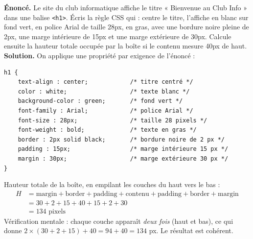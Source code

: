 \documentclass[11pt]{article}
\begin{document}
\begin{exoresolu}
\textbf{Énoncé.} Le site du club informatique affiche le titre « Bienvenue au Club Info » dans une balise \texttt{<h1>}. Écris la règle CSS qui : centre le titre, l'affiche en blanc sur fond vert, en police Arial de taille 28px, en gras, avec une bordure noire pleine de 2px, une marge intérieure de 15px et une marge extérieure de 30px. Calcule ensuite la hauteur totale occupée par la boîte si le contenu mesure 40px de haut.
\tcblower
\textbf{Solution.} On applique une propriété par exigence de l'énoncé :
\begin{lstlisting}
h1 {
    text-align : center;            /* titre centré */
    color : white;                  /* texte blanc */
    background-color : green;       /* fond vert */
    font-family : Arial;            /* police Arial */
    font-size : 28px;               /* taille 28 pixels */
    font-weight : bold;             /* texte en gras */
    border : 2px solid black;       /* bordure noire de 2 px */
    padding : 15px;                 /* marge intérieure 15 px */
    margin : 30px;                  /* marge extérieure 30 px */
}
\end{lstlisting}
Hauteur totale de la boîte, en empilant les couches du haut vers le bas :
\begin{align*}
H &= \text{margin} + \text{border} + \text{padding} + \text{contenu} + \text{padding} + \text{border} + \text{margin} \\
  &= 30 + 2 + 15 + 40 + 15 + 2 + 30 \\
  &= 134 \text{ pixels}
\end{align*}
Vérification mentale : chaque couche apparaît \emph{deux fois} (haut et bas), ce qui donne $2 \times (30 + 2 + 15) + 40 = 94 + 40 = 134$ px. Le résultat est cohérent.
\end{exoresolu}
\end{document}
